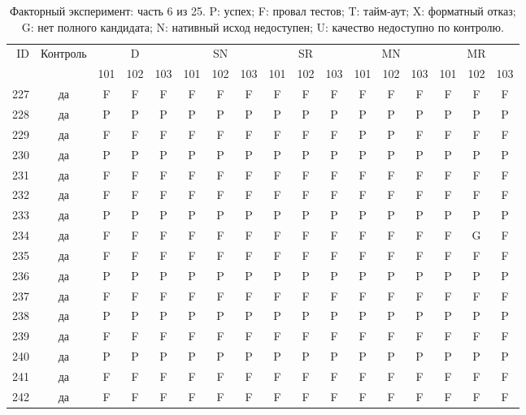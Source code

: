 \begin{table}[p]\centering\footnotesize
\setlength{\tabcolsep}{3pt}
\caption{Факторный эксперимент: часть 6 из 25. P: успех; F: провал тестов; T: тайм-аут; X: форматный отказ; G: нет полного кандидата; N: нативный исход недоступен; U: качество недоступно по контролю.}
\begin{tabular*}{\textwidth}{@{\extracolsep{\fill}}rcccccccccccccccc}\toprule
ID & Контроль & \multicolumn{3}{c}{D} & \multicolumn{3}{c}{SN} & \multicolumn{3}{c}{SR} & \multicolumn{3}{c}{MN} & \multicolumn{3}{c}{MR}\\
\cmidrule(lr){3-5}\cmidrule(lr){6-8}\cmidrule(lr){9-11}\cmidrule(lr){12-14}\cmidrule(lr){15-17}
 & & 101 & 102 & 103 & 101 & 102 & 103 & 101 & 102 & 103 & 101 & 102 & 103 & 101 & 102 & 103\\\midrule
227 & да & F & F & F & F & F & F & F & F & F & F & F & F & F & F & F\\
228 & да & P & P & P & P & P & P & P & P & P & P & P & P & P & P & P\\
229 & да & F & F & F & F & F & F & F & F & F & P & P & F & F & F & F\\
230 & да & P & P & P & P & P & P & P & P & P & P & P & P & P & P & P\\
231 & да & F & F & F & F & F & F & F & F & F & F & F & F & F & F & F\\
232 & да & F & F & F & F & F & F & F & F & F & F & F & F & F & F & F\\
233 & да & P & P & P & P & P & P & P & P & P & P & P & P & P & P & P\\
234 & да & F & F & F & F & F & F & F & F & F & F & F & F & F & G & F\\
235 & да & F & F & F & F & F & F & F & F & F & F & F & F & F & F & F\\
236 & да & P & P & P & P & P & P & P & P & P & P & P & P & P & P & P\\
237 & да & F & F & F & F & F & F & F & F & F & F & F & F & F & F & F\\
238 & да & P & P & P & P & P & P & P & P & P & P & P & P & P & P & P\\
239 & да & F & F & F & F & F & F & F & F & F & F & F & F & F & F & F\\
240 & да & P & P & P & P & P & P & P & P & P & P & P & P & P & P & P\\
241 & да & F & F & F & F & F & F & F & F & F & F & F & F & F & F & F\\
242 & да & F & F & F & F & F & F & F & F & F & F & F & F & F & F & F\\

\end{tabular*}
\end{table}
